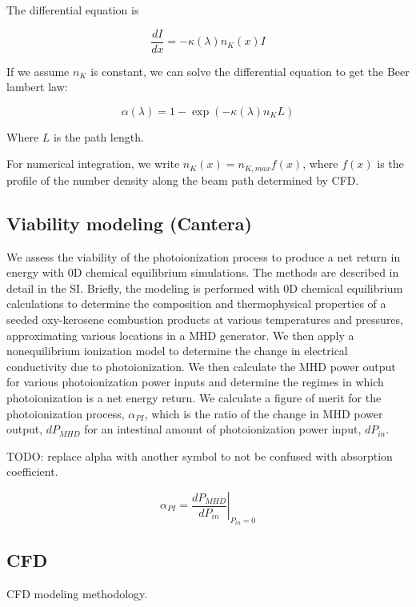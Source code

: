 The differential equation is 

\begin{equation}
    \frac{dI}{dx} = -\kappa(\lambda) n_K(x) I
\end{equation}

If we assume $n_K$ is constant, we can solve the differential equation to get the Beer lambert law:

\begin{equation}
    \alpha(\lambda) = 1 - \exp(-\kappa(\lambda) n_K L)
\end{equation}

Where $L$ is the path length.

For numerical integration, we write $n_K(x) = n_{K,max} f(x)$, where $f(x)$ is the profile of the number density along the beam path determined by CFD. 




\subsection{Viability modeling (Cantera)}

We assess the viability of the photoionization process to produce a net return in energy with 0D chemical equilibrium simulations. The methods are described in detail in the SI. Briefly, the modeling is performed with 0D chemical equilibrium calculations to determine the composition and thermophysical properties of a seeded oxy-kerosene combustion products at various temperatures and pressures, approximating various locations in a MHD generator. We then apply a nonequilibrium ionization model to determine the change in electrical conductivity due to photoionization. We then calculate the MHD power output for various photoionization power inputs and determine the regimes in which photoionization is a net energy return. We calculate a figure of merit for the photoionization process, $\alpha_{PI}$, which is the ratio of the change in MHD power output, $dP_{MHD}$ for an intestinal amount of photoionization power input, $dP_{in}$. 


TODO: replace alpha with another symbol to not be confused with absorption coefficient.


\begin{equation}
\alpha_{PI} = \left. \frac{{dP}_{MHD}}{{dP}_{in}} \right|_{P_{in}=0}
\end{equation}

\subsection{CFD}

CFD modeling methodology. 


